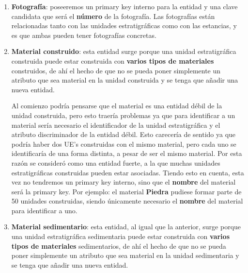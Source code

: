 \begin{enumerate}
        \item \textbf{Fotografía}: poseeremos un primary key interno para la entidad y una
        clave candidata que será el \textbf{número} de la fotografía. Las fotografías están
        relacionadas tanto con las unidades estratigráficas como con las estancias, y es que 
        ambas pueden tener fotografías concretas.
        
        \item \textbf{Material construido}: esta entidad surge porque una unidad estratigráfica
        construida puede estar construida con \textbf{varios tipos de materiales} construidos,
        de ahí el hecho de que no se pueda poner simplemente un atributo que sea material en
        la unidad construida y se tenga que añadir una nueva entidad.

        Al comienzo podría pensarse que el material es una entidad débil de la unidad
        construida, pero esto traería problemas ya que para identificar a un material sería
        necesario el identificador de la unidad estratigráfica y el atributo discriminador de
        la entidad débil. Esto carecería de sentido ya que podría haber dos UE's construidas
        con el mismo material, pero cada uno se identificaría de una forma distinta, a pesar
        de ser el mismo material. Por esta razón se consideró como una entidad fuerte, a la
        que muchas unidades estratigráficas construidas pueden estar asociadas. Tiendo esto
        en cuenta, esta vez no tendremos un primary key interno, sino que el \textbf{nombre}
        del material será la primary key. Por ejemplo: el material \textbf{Piedra} pudiese
        formar parte de 50 unidades construidas, siendo únicamente necesario el 
        \textbf{nombre} del material para identificar a uno.
        
        \item \textbf{Material sedimentario}: esta entidad, al igual que la anterior, surge
        porque una unidad estratigráfica sedimentaria puede estar construida con 
        \textbf{varios tipos de materiales} sedimentarios, de ahí el hecho de que no se pueda
        poner simplemente un atributo que sea material en la unidad sedimentaria y se tenga que
        añadir una nueva entidad.


\end{enumerate}

